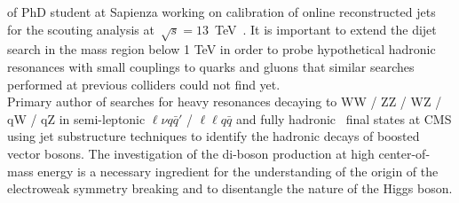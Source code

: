\documentclass[10pt, a4paper]{article}
\newcommand{\years}[1]{\marginnote{\hskip-0.2in{\scriptsize #1}}}
\begin{document}
of PhD student at Sapienza working on calibration of online
reconstructed jets for the scouting analysis
at~$\sqrt{s}=13$~TeV~\cite{Sirunyan:2016iap,AN-16-202}. 
It is important to extend the dijet search in the mass region below 1 TeV 
in order to probe hypothetical hadronic resonances with small
couplings to quarks and gluons that similar searches performed at
previous colliders could not find yet. \\ [1em] 
\years{12/2011 - 09/2014}Primary author of searches for heavy
resonances decaying to WW / ZZ / WZ / qW / qZ in semi-leptonic $\ell\nu q\bar{q}'$ / $\ell\ell q\bar{q}$ \cite{Khachatryan:2014gha,AN-13-045,AN-13-040} and fully hadronic~\cite{Khachatryan:2014hpa,AN-12-393,Chatrchyan:2012yxa,AN-11-524} final states at CMS using jet substructure techniques to identify the hadronic decays of boosted vector bosons. The investigation of the di-boson 
production at high center-of-mass energy is a necessary ingredient for the understanding of the origin of the electroweak symmetry breaking and to disentangle the nature of the Higgs boson. \\ [1em] 
\end{document}
